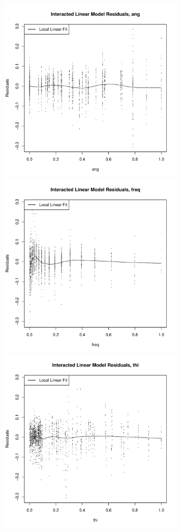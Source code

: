 \documentclass[11pt]{article}
\theoremstyle{definition}
\begin{document}
\begin{itemize}
\begin{itemize}
                \includegraphics[width=9cm]{final/1b_res_plot_int_ang} \\ 
                \includegraphics[width=9cm]{final/1b_res_plot_int_freq}  
                \includegraphics[width=9cm]{final/1b_res_plot_int_thi} \\ 

\end{itemize}
\end{itemize}
\end{document}
